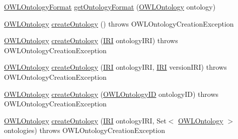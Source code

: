 \begin{DoxyCompactItemize}
\item 
\hyperlink{classorg_1_1semanticweb_1_1owlapi_1_1model_1_1_o_w_l_ontology_format}{O\-W\-L\-Ontology\-Format} \hyperlink{classuk_1_1ac_1_1manchester_1_1cs_1_1owl_1_1owlapi_1_1_o_w_l_ontology_manager_impl_a89dad2f0e1b3444df4fe1449e05e8d29}{get\-Ontology\-Format} (\hyperlink{interfaceorg_1_1semanticweb_1_1owlapi_1_1model_1_1_o_w_l_ontology}{O\-W\-L\-Ontology} ontology)
\item 
\hyperlink{interfaceorg_1_1semanticweb_1_1owlapi_1_1model_1_1_o_w_l_ontology}{O\-W\-L\-Ontology} \hyperlink{classuk_1_1ac_1_1manchester_1_1cs_1_1owl_1_1owlapi_1_1_o_w_l_ontology_manager_impl_a2b1f95f9ba116f741e5f47c81adc8151}{create\-Ontology} ()  throws O\-W\-L\-Ontology\-Creation\-Exception 
\item 
\hyperlink{interfaceorg_1_1semanticweb_1_1owlapi_1_1model_1_1_o_w_l_ontology}{O\-W\-L\-Ontology} \hyperlink{classuk_1_1ac_1_1manchester_1_1cs_1_1owl_1_1owlapi_1_1_o_w_l_ontology_manager_impl_a5a777d2f791f2d6cdebd922230eeed99}{create\-Ontology} (\hyperlink{classorg_1_1semanticweb_1_1owlapi_1_1model_1_1_i_r_i}{I\-R\-I} ontology\-I\-R\-I)  throws O\-W\-L\-Ontology\-Creation\-Exception 
\item 
\hyperlink{interfaceorg_1_1semanticweb_1_1owlapi_1_1model_1_1_o_w_l_ontology}{O\-W\-L\-Ontology} \hyperlink{classuk_1_1ac_1_1manchester_1_1cs_1_1owl_1_1owlapi_1_1_o_w_l_ontology_manager_impl_a75743552932eab827c693432884d36b4}{create\-Ontology} (\hyperlink{classorg_1_1semanticweb_1_1owlapi_1_1model_1_1_i_r_i}{I\-R\-I} ontology\-I\-R\-I, \hyperlink{classorg_1_1semanticweb_1_1owlapi_1_1model_1_1_i_r_i}{I\-R\-I} version\-I\-R\-I)  throws O\-W\-L\-Ontology\-Creation\-Exception 
\item 
\hyperlink{interfaceorg_1_1semanticweb_1_1owlapi_1_1model_1_1_o_w_l_ontology}{O\-W\-L\-Ontology} \hyperlink{classuk_1_1ac_1_1manchester_1_1cs_1_1owl_1_1owlapi_1_1_o_w_l_ontology_manager_impl_a9d548ac945b1d80d1fb0c388653364c2}{create\-Ontology} (\hyperlink{classorg_1_1semanticweb_1_1owlapi_1_1model_1_1_o_w_l_ontology_i_d}{O\-W\-L\-Ontology\-I\-D} ontology\-I\-D)  throws O\-W\-L\-Ontology\-Creation\-Exception 
\item 
\hyperlink{interfaceorg_1_1semanticweb_1_1owlapi_1_1model_1_1_o_w_l_ontology}{O\-W\-L\-Ontology} \hyperlink{classuk_1_1ac_1_1manchester_1_1cs_1_1owl_1_1owlapi_1_1_o_w_l_ontology_manager_impl_a3bd60e64bf918f5b6e02d8c5f382c378}{create\-Ontology} (\hyperlink{classorg_1_1semanticweb_1_1owlapi_1_1model_1_1_i_r_i}{I\-R\-I} ontology\-I\-R\-I, Set$<$ \hyperlink{interfaceorg_1_1semanticweb_1_1owlapi_1_1model_1_1_o_w_l_ontology}{O\-W\-L\-Ontology} $>$ ontologies)  throws O\-W\-L\-Ontology\-Creation\-Exception 

\end{DoxyCompactItemize}
